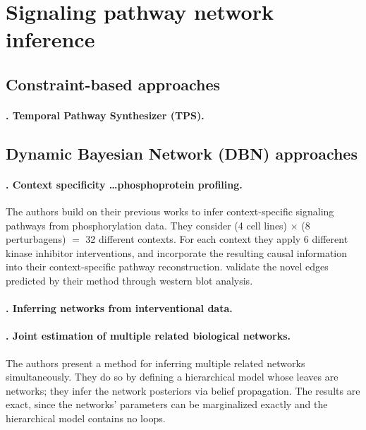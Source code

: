 \documentclass[14pt]{article}
\begin{document}
\section{Signaling pathway network inference}

\subsection{Constraint-based approaches}

\paragraph{ \citet{2018-koksal-tps}. Temporal Pathway Synthesizer (TPS). }




\subsection{Dynamic Bayesian Network (DBN) approaches}

\paragraph{ \citet{2017-hill-context}. Context specificity \ldots phosphoprotein profiling.}
The authors build on their previous works 
\citep{2015-spencer-interventional} 
\citep{2014-oates-joint}
to infer context-specific signaling pathways from phosphorylation data.
They consider (4 cell lines) $\times$ (8 perturbagens) $=$ 32 different contexts.
For each context they apply 6 different kinase inhibitor interventions, and incorporate the resulting causal information into their context-specific pathway reconstruction.
\citeauthor{2017-hill-context} validate the novel edges predicted by their method through western blot analysis.

\paragraph{ \citet{2015-spencer-interventional}. Inferring networks from interventional data.}

\paragraph{ \citet{2014-oates-joint}. Joint estimation of multiple related biological networks.}
The authors present a method for inferring multiple related networks simultaneously.
They do so by defining a hierarchical model whose leaves are networks;
they infer the network posteriors via belief propagation.
The results are exact, since the networks' parameters can be marginalized exactly and the hierarchical model contains no loops. 
\end{document}
